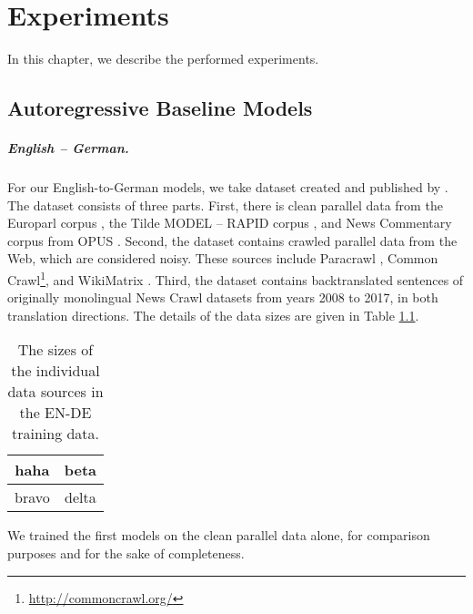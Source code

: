 \chapter{Experiments}
\label{chap:experiments}


In this chapter, we describe the performed experiments. 

\section{Autoregressive Baseline Models}
\label{sec:exp:autoregressive}

\paragraph{English -- German.} For our English-to-German models, we take
dataset created and published by \citet{germann2020university}. The dataset
consists of three parts. First, there is clean parallel data from the Europarl
corpus \citep{koehn2005europarl}, the Tilde MODEL -- RAPID corpus
\citep{rozis-skadins-2017-tilde}, and News Commentary corpus from OPUS
\citep{tiedemann2012opus}. Second, the dataset contains crawled parallel data
from the Web, which are considered noisy. These sources include Paracrawl
\citep{espla-etal-2019-paracrawl}, Common
Crawl\footnote{\url{http://commoncrawl.org/}}, and WikiMatrix
\citep{schwenk2019wikimatrix}. Third, the dataset contains backtranslated
sentences of originally monolingual News Crawl datasets from years 2008 to
2017, in both translation directions. The details of the data sizes are given
in Table \ref{tab:ende-data-sizes}.

\begin{table}
  \centering
  \begin{tabular}{cc}
    \toprule
    haha & beta \\
    \midrule
    bravo & delta \\
    \bottomrule
  \end{tabular}

  \caption{The sizes of the individual data sources in the EN-DE training
    data.}%
  \label{tab:ende-data-sizes}
\end{table}

We trained the first models on the clean parallel data alone, for comparison
purposes and for the sake of completeness.

